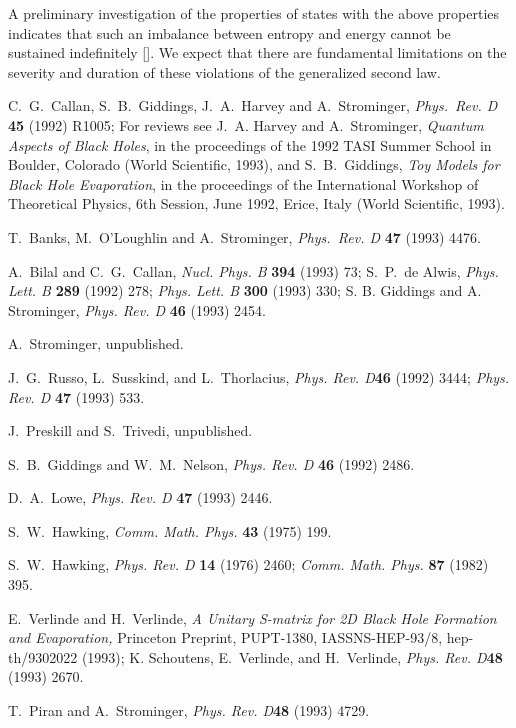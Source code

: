 A preliminary investigation of the properties of states with the above
properties indicates that such an imbalance between entropy and energy cannot
be sustained indefinitely [\cite{prtr}].  We expect that there are fundamental
limitations on the severity and duration of these violations of the generalized
second law.



 C.~G.~Callan, S.~B.~Giddings, J.~A.~Harvey and A.~Strominger,
 {\sl Phys.\ Rev. D  } {\bf 45}
(1992) R1005; For reviews see J.~A.
Harvey and A.~Strominger,
{\it Quantum Aspects of Black Holes}, in the proceedings of the 1992 TASI
Summer School in Boulder, Colorado (World Scientific, 1993),
and S.~B.~Giddings, {\it Toy Models for Black Hole Evaporation}, in the
proceedings of the
International Workshop of Theoretical Physics, 6th Session, June 1992, Erice,
Italy (World Scientific, 1993).

 T.~Banks, M.~O'Loughlin and A.~Strominger, {\sl Phys.\ Rev. D  }
{\bf 47}
(1993) 4476.

 A.~Bilal and C.~G.~Callan, {\sl Nucl. Phys. B} {\bf 394}
(1993) 73; S.~P.~de Alwis,
 {\sl Phys. Lett. B} {\bf 289\/} (1992) 278;
 {\sl Phys. Lett. B} {\bf 300\/} (1993) 330;
 S. B. Giddings and A. Strominger, {\sl Phys. Rev. D} {\bf 46\/} (1993) 2454.

 A.~Strominger, unpublished.

 J.~G.~Russo, L.~Susskind, and L.~Thorlacius, {\sl Phys. Rev.
D\/}{\bf 46\/} (1992) 3444; {\sl Phys. Rev. D\/} {\bf 47\/} (1993) 533.

 J.~Preskill and S.~Trivedi, unpublished.

 S.~B.~Giddings and W.~M.~Nelson,
{\sl Phys. Rev. D} {\bf 46\/} (1992) 2486.


 D.~A.~Lowe,
{\sl Phys. Rev. D\/} {\bf 47} (1993) 2446.


 S.~W.~Hawking,
 {\sl Comm. Math. Phys.} {\bf 43} (1975) 199.

 S.~W.~Hawking,
 {\sl Phys. Rev. D} {\bf 14} (1976) 2460; {\sl Comm. Math. Phys.} {\bf 87}
(1982) 395.

E.~Verlinde and H.~Verlinde,
{\it A Unitary S-matrix for 2D Black Hole Formation and Evaporation,}
Princeton Preprint, PUPT-1380, IASSNS-HEP-93/8, hep-th/9302022 (1993);
 K. Schoutens, E.~Verlinde, and H.~Verlinde, {\sl Phys. Rev. D\/}{\bf 48}
(1993) 2670.

T.~Piran and A.~Strominger, {\sl Phys. Rev. D\/}{\bf 48} (1993)
4729.

